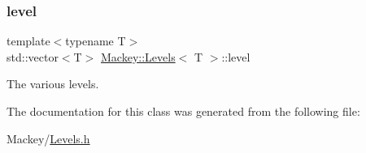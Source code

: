 \subsubsection{\texorpdfstring{level}{level}}
{\footnotesize\ttfamily template$<$typename T$>$ \\
std\+::vector$<$T$>$ \hyperlink{classMackey_1_1Levels}{Mackey\+::\+Levels}$<$ T $>$\+::level}



The various levels. 



The documentation for this class was generated from the following file\+:\begin{DoxyCompactItemize}
\item 
Mackey/\hyperlink{Levels_8h}{Levels.\+h}\end{DoxyCompactItemize}

